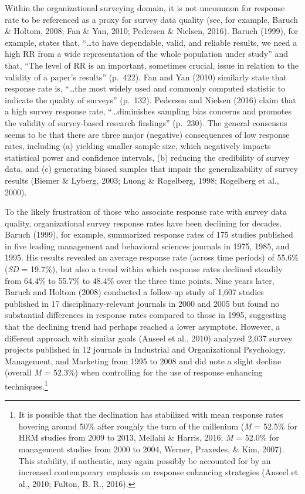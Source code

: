 \documentclass[
  ,man,floatsintext]{apa6}
\begin{document}
Within the organizational surveying domain, it is not uncommon for response rate to be referenced as a proxy for survey data quality (see, for example, Baruch \& Holtom, 2008; Fan \& Yan, 2010; Pedersen \& Nielsen, 2016). Baruch (1999), for example, states that, ``\ldots to have dependable, valid, and reliable results, we need a high RR from a wide representation of the whole population under study'' and that, ``The level of RR is an important, sometimes crucial, issue in relation to the validity of a paper's results'' (p.~422). Fan and Yan (2010) similarly state that response rate is, ``\ldots the most widely used and commonly computed statistic to indicate the quality of surveys'' (p.~132). Pedersen and Nielsen (2016) claim that a high survey response rate, ``\ldots diminishes sampling bias concerns and promotes the validity of survey-based research findings'' (p.~230). The general consensus seems to be that there are three major (negative) consequences of low response rates, including (a) yielding smaller sample size, which negatively impacts statistical power and confidence intervals, (b) reducing the credibility of survey data, and (c) generating biased samples that impair the generalizability of survey results (Biemer \& Lyberg, 2003; Luong \& Rogelberg, 1998; Rogelberg et al., 2000).

To the likely frustration of those who associate response rate with survey data quality, organizational survey response rates have been declining for decades. Baruch (1999), for example, summarized response rates of 175 studies published in five leading management and behavioral sciences journals in 1975, 1985, and 1995. His results revealed an average response rate (across time periods) of 55.6\% (\emph{SD} = 19.7\%), but also a trend within which response rates declined steadily from 64.4\% to 55.7\% to 48.4\% over the three time points. Nine years later, Baruch and Holtom (2008) conducted a follow-up study of 1,607 studies published in 17 disciplinary-relevant journals in 2000 and 2005 but found no substantial differences in response rates compared to those in 1995, suggesting that the declining trend had perhaps reached a lower asymptote. However, a different approach with similar goals (Anseel et al., 2010) analyzed 2,037 survey projects published in 12 journals in Industrial and Organizational Psychology, Management, and Marketing from 1995 to 2008 and did note a slight decline (overall \emph{M} = 52.3\%) when controlling for the use of response enhancing techniques.\footnote{It is possible that the declination has stabilized with mean response rates hovering around 50\% after roughly the turn of the millenium (\emph{M} = 52.5\% for HRM studies from 2009 to 2013, Mellahi \& Harris, 2016; \emph{M} = 52.0\% for management studies from 2000 to 2004, Werner, Praxedes, \& Kim, 2007). This stability, if authentic, may again possibly be accounted for by an increased contemporary emphasis on response enhancing strategies (Anseel et al., 2010; Fulton, B. R., 2016).}
\end{document}
